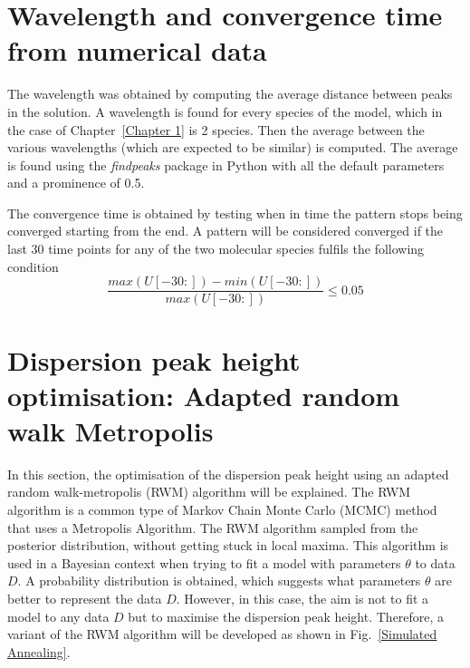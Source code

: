 \section{Wavelength and convergence time from numerical data}\label{Wavelength and convergence time from numerical data}
The wavelength was obtained by computing the average distance between peaks in the solution.
A wavelength is found for every species of the model, which in the case of Chapter~\ref{Chapter 1} is 2 species.
Then the average between the various wavelengths (which are expected to be similar) is computed.
The average is found using the \textit{findpeaks} package in Python with all the default parameters and a prominence of 0.5.

The convergence time is obtained by testing when in time the pattern stops being converged starting from the end.
A pattern will be considered converged if the last 30 time points for any of the two molecular species fulfils the following condition
\begin{equation}
    \frac{max(U[-30:]) - min(U[-30:])}{max(U[-30:])} \leq 0.05
\end{equation}

\section{Dispersion peak height optimisation: Adapted random walk Metropolis}\label{dispersion_peak_optimisation}
In this section, the optimisation of the dispersion peak height using an adapted random walk-metropolis (RWM) algorithm will be explained.
The RWM algorithm is a common type of Markov Chain Monte Carlo (MCMC) method that uses a Metropolis Algorithm.
The RWM algorithm sampled from the posterior distribution, without getting stuck in local maxima.
This algorithm is used in a Bayesian context when trying to fit a model with parameters $\theta$ to data $D$.
A probability distribution is obtained, which suggests what parameters $\theta$ are better to represent the data $D$.
However, in this case, the aim is not to fit a model to any data $D$ but to maximise the dispersion peak height.
Therefore, a variant of the RWM algorithm will be developed as shown in Fig.~\ref{Simulated Annealing}.

